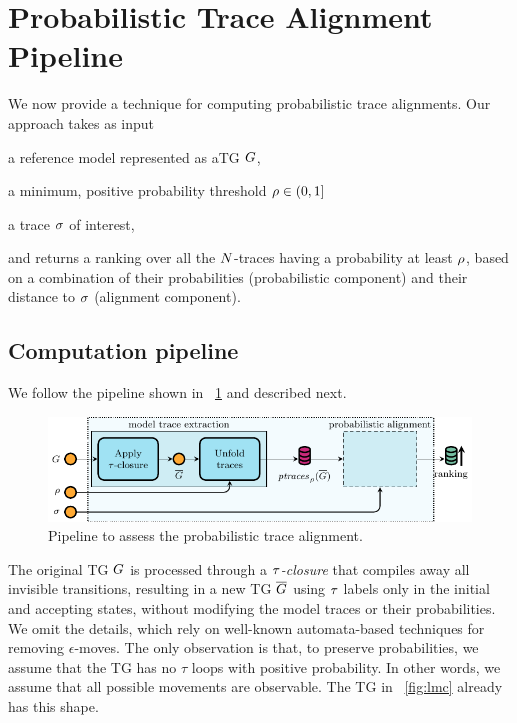 
\section{Probabilistic Trace Alignment Pipeline}
We now provide a technique for computing probabilistic trace alignments. Our approach takes as input
\begin{inparaenum}[\it (i)]
\item a reference model represented as aTG $G$,
\item a minimum, positive probability threshold $\rho \in (0,1]$
\item a trace $\sigma$ of interest,
\end{inparaenum}
and returns a ranking over all the $N$-traces having a probability at least $\rho$, based on a combination of their probabilities
(probabilistic component) and their distance to $\sigma$ (alignment component).


\subsection{Computation pipeline}
We follow the pipeline shown in \figurename~\ref{fig:pipe} and described next.
%
\begin{figure}[!t]
	\includegraphics[width=\columnwidth]{images/pipelineShort}
	\caption{Pipeline to assess the probabilistic trace alignment.}\label{fig:pipe}
\end{figure}
%
%
%
The original TG $G$ is processed through a \emph{$\tau$-closure} that compiles away all invisible transitions, resulting in
a new TG $\overline{G}$ using $\tau$ labels only in the initial and accepting states, without modifying the
model traces or their probabilities. We omit the details, which rely on well-known automata-based techniques for removing
$\epsilon$-moves. The only observation is that, to preserve probabilities, we assume that the TG has no $\tau$ loops with
positive probability. In other words, we assume that all possible movements are observable.
The TG in \figurename~\ref{fig:lmc} already has this shape.

